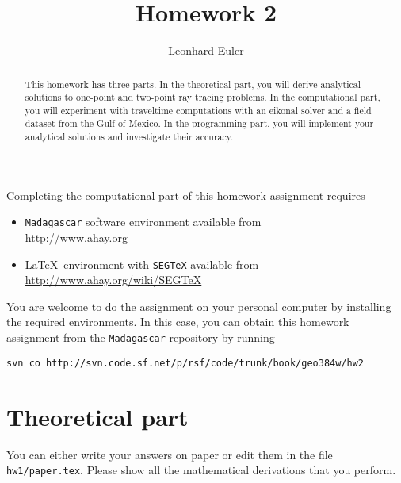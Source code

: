 \author{Leonhard Euler} 
\title{Homework 2}

\begin{abstract}
  This homework has three parts. In the theoretical part, you will
  derive analytical solutions to one-point and two-point ray tracing
  problems. In the computational part, you will experiment with
  traveltime computations with an eikonal solver and a field dataset
  from the Gulf of Mexico. In the programming part, you will implement
  your analytical solutions and investigate their accuracy.
\end{abstract}

Completing the computational part of this homework assignment requires
\begin{itemize}
\item \texttt{Madagascar} software environment available from \\
  \url{http://www.ahay.org}
\item \LaTeX\ environment with \texttt{SEGTeX} available from \\ 
  \url{http://www.ahay.org/wiki/SEGTeX}
\end{itemize}

You are welcome to do the assignment on your personal computer by
installing the required environments. In this case, you can obtain this
homework assignment from the \texttt{Madagascar} repository by running
\begin{verbatim}
svn co http://svn.code.sf.net/p/rsf/code/trunk/book/geo384w/hw2
\end{verbatim}

\section{Theoretical part}

You can either write your answers on paper or edit them in the file
\verb#hw1/paper.tex#. Please show all the mathematical
derivations that you perform.

